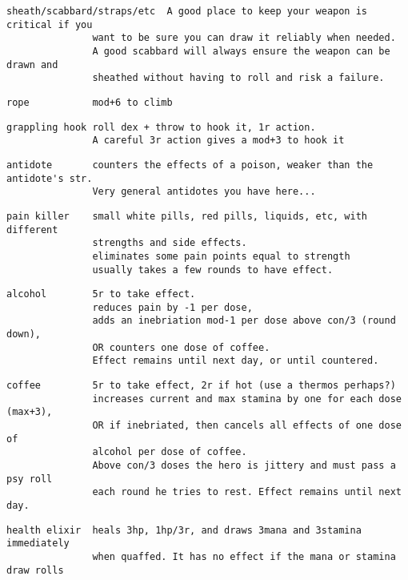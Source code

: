 \small \begin{samepage} \begin{verbatim}
sheath/scabbard/straps/etc  A good place to keep your weapon is critical if you
               want to be sure you can draw it reliably when needed.
               A good scabbard will always ensure the weapon can be drawn and
               sheathed without having to roll and risk a failure.
\end{verbatim} \blocklistgap \begin{verbatim}
rope           mod+6 to climb
\end{verbatim} \blocklistgap \begin{verbatim}
grappling hook roll dex + throw to hook it, 1r action.
               A careful 3r action gives a mod+3 to hook it
\end{verbatim} \blocklistgap \begin{verbatim}
antidote       counters the effects of a poison, weaker than the antidote's str.
               Very general antidotes you have here...
\end{verbatim} \blocklistgap \begin{verbatim}
pain killer    small white pills, red pills, liquids, etc, with different
               strengths and side effects.
               eliminates some pain points equal to strength
               usually takes a few rounds to have effect.
\end{verbatim} \blocklistgap \begin{verbatim}
alcohol        5r to take effect.
               reduces pain by -1 per dose,
               adds an inebriation mod-1 per dose above con/3 (round down),
               OR counters one dose of coffee.
               Effect remains until next day, or until countered.
\end{verbatim} \blocklistgap \begin{verbatim}
coffee         5r to take effect, 2r if hot (use a thermos perhaps?)
               increases current and max stamina by one for each dose (max+3),
               OR if inebriated, then cancels all effects of one dose of
               alcohol per dose of coffee.
               Above con/3 doses the hero is jittery and must pass a psy roll
               each round he tries to rest. Effect remains until next day.
\end{verbatim} \blocklistgap \begin{verbatim}
health elixir  heals 3hp, 1hp/3r, and draws 3mana and 3stamina immediately
               when quaffed. It has no effect if the mana or stamina draw rolls

\end{verbatim}
\end{samepage}
